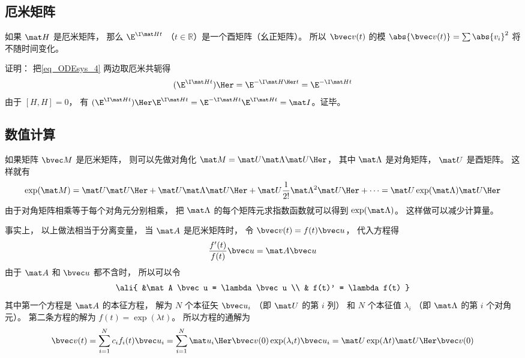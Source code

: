 \subsection{厄米矩阵}
如果 $\mat H$ 是厄米矩阵， 那么 $\E^{\I \mat H t}$ （$t\in \mathbb R$）是一个酉矩阵（幺正矩阵）。 所以 $\bvec v(t)$ 的模 $\abs{\bvec v(t)} = \sum \abs{v_i}^2$ 将不随时间变化。

证明： 把\autoref{eq_ODEsys_4} 两边取厄米共轭得
\begin{equation}
(\E^{\I \mat H t})\Her = \E^{-\I \mat H\Her t} = \E^{-\I \mat H t}
\end{equation}
由于 $[H,H] = 0$， 有 $(\E^{\I \mat H t})\Her \E^{\I \mat H t} = \E^{-\I \mat H t}\E^{\I \mat H t} = \mat I$。证毕。

\subsection{数值计算}
如果矩阵 $\bvec M$ 是厄米矩阵， 则可以先做对角化 $\mat M = \mat U \mat \Lambda \mat U\Her$， 其中 $\mat \Lambda$ 是对角矩阵， $\mat U$ 是酉矩阵。 这样就有
\begin{equation}
\exp(\mat M) = \mat U \mat U\Her + \mat U\mat \Lambda\mat U\Her + \mat U\frac1{2!} \mat \Lambda^2 \mat U\Her + \dots = \mat U \exp(\mat \Lambda) \mat U\Her
\end{equation}
由于对角矩阵相乘等于每个对角元分别相乘， 把 $\mat\Lambda$ 的每个矩阵元求指数函数就可以得到 $\exp(\mat \Lambda)$。 这样做可以减少计算量。

事实上， 以上做法相当于分离变量， 当 $\mat A$ 是厄米矩阵时， 令 $\bvec v(t) = f(t)\bvec u$， 代入方程得 
\begin{equation}
\frac{f'(t)}{f(t)} \bvec u = \mat A \bvec u
\end{equation}
由于 $\mat A$ 和 $\bvec u$ 都不含时， 所以可以令
\begin{equation}\ali{
&\mat A \bvec u = \lambda \bvec u \\
& f(t)' = \lambda f(t)
}\end{equation}
其中第一个方程是 $\mat A$ 的本征方程， 解为 $N$ 个本征矢 $\bvec u_i$ （即 $\mat U$ 的第 $i$ 列） 和 $N$ 个本征值 $\lambda_i$ （即 $\mat \Lambda$ 的第 $i$ 个对角元）。 第二条方程的解为 $f(t) = \exp(\lambda t)$。 所以方程的通解为
\begin{equation}
\bvec v(t) = \sum_{i = 1}^N c_i f_i(t) \bvec u_i = \sum_{i = 1}^N \mat u_i\Her  \bvec v(0) \exp(\lambda_i t) \bvec u_i = \mat U \exp(\Lambda t) \mat U\Her \bvec v(0)
\end{equation}

